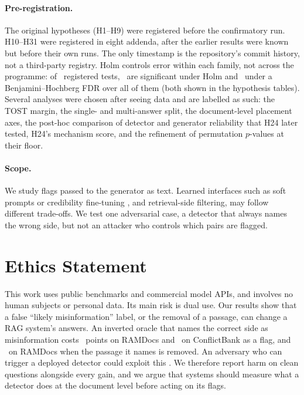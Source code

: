 \paragraph{Pre-registration.} The original hypotheses (H1--H9) were registered before the confirmatory run. H10--H31
were registered in eight addenda, after the earlier results were known but before their own runs. The only
timestamp is the repository's commit history, not a third-party registry. Holm controls error within each family, not
across the programme: of \fdrN\ registered tests, \fdrHolm\ are significant under Holm and \fdrBH\ under a
Benjamini--Hochberg FDR over all of them (both shown in the hypothesis tables). Several analyses were chosen after
seeing data and are labelled as such: the TOST margin, the single- and multi-answer split, the document-level
placement axes, the post-hoc comparison of detector and generator reliability that H24 later tested, H24's mechanism
score, and the refinement of permutation $p$-values at their floor.

\paragraph{Scope.} We study flags passed to the generator as text. Learned interfaces such as soft prompts or
credibility fine-tuning \citep{ye2026tcr,pan2024credibility}, and retrieval-side filtering, may follow different
trade-offs. We test one adversarial case, a detector that always names the wrong side, but not an attacker who controls
which pairs are flagged.

\section*{Ethics Statement}
This work uses public benchmarks and commercial model APIs, and involves no human subjects or personal data. Its main
risk is dual use. Our results show that a false ``likely misinformation'' label, or the removal of a passage, can
change a RAG system's answers. An inverted oracle that names the correct side as misinformation costs \aadvDirConf\
points on RAMDocs and \azCbMiniOracleInvFlagDirectionalConflict\ on ConflictBank as a flag, and \aadvRemConf\ on
RAMDocs when the passage it names is removed. An adversary who can trigger a deployed detector could exploit this
\citep{zou2025poisonedrag}. We therefore report harm on clean questions alongside every gain, and we argue that
systems should measure what a detector does at the document level before acting on its flags.
